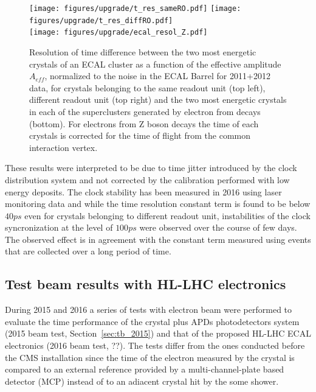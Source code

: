\begin{figure}[h!]
  \centering
  \texttt{[image: figures/upgrade/t\_res\_sameRO.pdf]}
  \texttt{[image: figures/upgrade/t\_res\_diffRO.pdf]}\\
  \texttt{[image: figures/upgrade/ecal\_resol\_Z.pdf]}
  \caption{Resolution of time difference between the two most energetic crystals of an ECAL cluster as a function of the
    effective amplitude $A_{eff}$, normalized to the noise in the ECAL Barrel for 2011+2012 data,
    for crystals belonging to the same readout unit (top left), different readout unit (top right) and the two most
    energetic crystals in each of the superclusters generated by electron from \Zee decays (bottom).
    For electrons from Z boson decays the time of each crystals is corrected for the time of flight from the common
  interaction vertex.}
  \label{fig:ecal_runI_time}
\end{figure}

These results were interpreted to be due to time jitter introduced by the clock distribution system and not corrected by
the calibration performed with low energy deposits. The clock stability has been measured in 2016 using laser monitoring data
and while the time resolution constant term is found to be below $40 ps$ even for crystals belonging to different readout unit,
instabilities of the clock syncronization at the level of $100 ps$ were observed over the course of few days. The
observed effect is in agreement with the constant term measured using \Zee events that are collected over a long period of time.

\subsection{Test beam results with HL-LHC electronics}
During 2015 and 2016 a series of tests with electron beam were performed to evaluate the time performance
of the \PbWO crystal plus APDs photodetectors system (2015 beam test, Section~\ref{sec:tb_2015})
and that of the proposed HL-LHC ECAL electronics (2016 beam test, ??).
The tests differ from the ones conducted before the CMS installation since the time of the electron measured by the
crystal is compared to an external reference provided by a multi-channel-plate based detector (MCP) instead of to an adiacent
crystal hit by the some shower.

